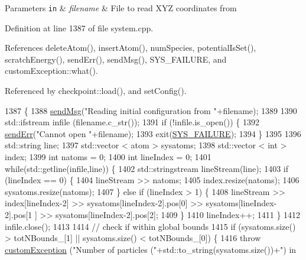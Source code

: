 \begin{DoxyParams}[1]{Parameters}
\mbox{\tt in}  & {\em filename} & File to read X\-Y\-Z coordinates from \\
\hline
\end{DoxyParams}


Definition at line 1387 of file system.\-cpp.



References delete\-Atom(), insert\-Atom(), num\-Species, potential\-Is\-Set(), scratch\-Energy(), send\-Err(), send\-Msg(), S\-Y\-S\-\_\-\-F\-A\-I\-L\-U\-R\-E, and custom\-Exception\-::what().



Referenced by checkpoint\-::load(), and set\-Config().


\begin{DoxyCode}
1387                                               \{
1388     \hyperlink{utilities_8cpp_a08974c73a5b36c28b8ad1ef47fca77b0}{sendMsg}(\textcolor{stringliteral}{"Reading initial configuration from "}+filename);
1389 
1390     std::ifstream infile (filename.c\_str());
1391     \textcolor{keywordflow}{if} (!infile.is\_open()) \{
1392         \hyperlink{utilities_8cpp_a6dacf3c3c19aa1e13a4d5a148fe5114e}{sendErr}(\textcolor{stringliteral}{"Cannot open "}+filename);
1393         exit(\hyperlink{global_8h_a428dfe1ef0a6ff4b1fdebf275f6aff2e}{SYS\_FAILURE});
1394     \}
1395 
1396     std::string line;
1397     std::vector < atom > sysatoms;
1398     std::vector < int > index;
1399     \textcolor{keywordtype}{int} natoms = 0;
1400     \textcolor{keywordtype}{int} lineIndex = 0;
1401     \textcolor{keywordflow}{while}(std::getline(infile,line)) \{
1402         std::stringstream lineStream(line);
1403         \textcolor{keywordflow}{if} (lineIndex == 0) \{
1404             lineStream >> natoms;
1405             index.resize(natoms);
1406             sysatoms.resize(natoms);
1407         \} \textcolor{keywordflow}{else} \textcolor{keywordflow}{if} (lineIndex > 1) \{
1408             lineStream >> index[lineIndex-2] >> sysatoms[lineIndex-2].pos[0] >> sysatoms[lineIndex-2].pos[1
      ] >> sysatoms[lineIndex-2].pos[2];
1409         \}
1410         lineIndex++;
1411     \}
1412     infile.close();
1413 
1414     \textcolor{comment}{// check if within global bounds}
1415     \textcolor{keywordflow}{if} (sysatoms.size() > totNBounds\_[1] || sysatoms.size() < totNBounds\_[0]) \{
1416         \textcolor{keywordflow}{throw} \hyperlink{classcustom_exception}{customException} (\textcolor{stringliteral}{"Number of particles ("}+std::to\_string(sysatoms.size())+\textcolor{stringliteral}{") in
}
\end{DoxyCode}
